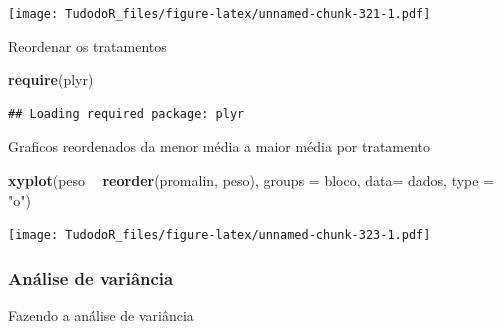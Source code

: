 \documentclass[
]{book}
\newenvironment{Shaded}{\begin{snugshade}}{\end{snugshade}}
\newcommand{\DataTypeTok}[1]{\textcolor[rgb]{0.13,0.29,0.53}{#1}}
\newcommand{\KeywordTok}[1]{\textcolor[rgb]{0.13,0.29,0.53}{\textbf{#1}}}
\newcommand{\NormalTok}[1]{#1}
\newcommand{\OperatorTok}[1]{\textcolor[rgb]{0.81,0.36,0.00}{\textbf{#1}}}
\newcommand{\StringTok}[1]{\textcolor[rgb]{0.31,0.60,0.02}{#1}}
\begin{document}
\texttt{[image: TudodoR\_files/figure-latex/unnamed-chunk-321-1.pdf]}

Reordenar os tratamentos

\begin{Shaded}
\begin{Highlighting}[]
\KeywordTok{require}\NormalTok{(plyr)}
\end{Highlighting}
\end{Shaded}

\begin{verbatim}
## Loading required package: plyr
\end{verbatim}

\begin{Shaded}
\end{Shaded}

Graficos reordenados da menor média a maior média por tratamento

\begin{Shaded}
\begin{Highlighting}[]
\KeywordTok{xyplot}\NormalTok{(peso }\OperatorTok{~}\StringTok{ }\KeywordTok{reorder}\NormalTok{(promalin, peso), }
        \DataTypeTok{groups =}\NormalTok{ bloco, }
        \DataTypeTok{data=}\NormalTok{ dados,}
        \DataTypeTok{type =} \StringTok{"o"}\NormalTok{)}
\end{Highlighting}
\end{Shaded}

\texttt{[image: TudodoR\_files/figure-latex/unnamed-chunk-323-1.pdf]}

\hypertarget{anuxe1lise-de-variuxe2ncia-1}{%
\subsubsection{Análise de variância}\label{anuxe1lise-de-variuxe2ncia-1}}

Fazendo a análise de variância

\begin{Shaded}
\end{Shaded}
\end{document}
